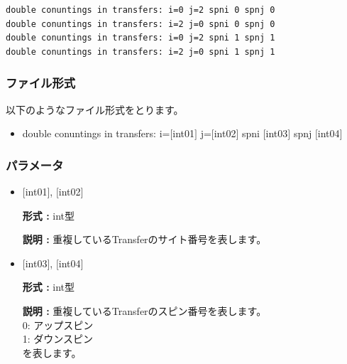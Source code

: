 \begin{minipage}{12.5cm}
\begin{screen}
\begin{verbatim}
double conuntings in transfers: i=0 j=2 spni 0 spnj 0  
double conuntings in transfers: i=2 j=0 spni 0 spnj 0  
double conuntings in transfers: i=0 j=2 spni 1 spnj 1  
double conuntings in transfers: i=2 j=0 spni 1 spnj 1  
\end{verbatim}
\end{screen}
\end{minipage}

\subsubsection{ファイル形式}
以下のようなファイル形式をとります。
 \begin{itemize}
   \item  double conuntings in transfers: i=$[$int01$]$ j=$[$int02$]$ spni $[$int03$]$  spnj $[$int04$]$   
 \end{itemize}
 
\subsubsection{パラメータ}
 \begin{itemize}

    \item  $[$int01$]$, $[$int02$]$
   
    {\bf 形式 :} int型

   {\bf 説明 :} 重複しているTransferのサイト番号を表します。
      
         \item  $[$int03$]$, $[$int04$]$  
   
    {\bf 形式 :} int型

   {\bf 説明 :} 重複しているTransferのスピン番号を表します。\\
0: アップスピン\\
1: ダウンスピン\\
を表します。
 
\end{itemize}

\newpage
